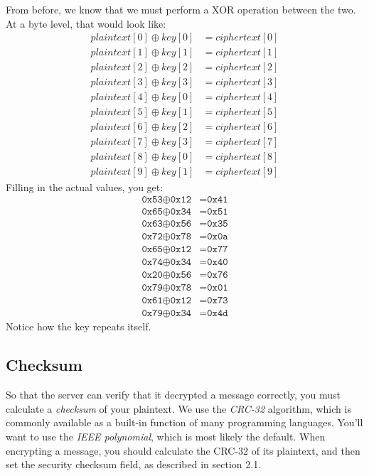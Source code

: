 \documentclass{report}
\newcommand{\code}[1]{\texttt{#1}}
\newcommand*\xor{\oplus}
\begin{document}
From before, we know that we must perform a XOR operation between the two. At a byte level, that would look like:
\begin{equation*}
\begin{split}
	plaintext[0] \xor key[0] &= ciphertext[0] \\
	plaintext[1] \xor key[1] &= ciphertext[1] \\
	plaintext[2] \xor key[2] &= ciphertext[2] \\
	plaintext[3] \xor key[3] &= ciphertext[3] \\
	plaintext[4] \xor key[0] &= ciphertext[4] \\
	plaintext[5] \xor key[1] &= ciphertext[5] \\
	plaintext[6] \xor key[2] &= ciphertext[6] \\
	plaintext[7] \xor key[3] &= ciphertext[7] \\
	plaintext[8] \xor key[0] &= ciphertext[8] \\
	plaintext[9] \xor key[1] &= ciphertext[9]
\end{split}
\end{equation*}
Filling in the actual values, you get:
\begin{equation*}
\begin{split}
	\code{0x53} \xor \code{0x12} &= \code{0x41} \\
	\code{0x65} \xor \code{0x34} &= \code{0x51} \\
	\code{0x63} \xor \code{0x56} &= \code{0x35} \\
	\code{0x72} \xor \code{0x78} &= \code{0x0a} \\
	\code{0x65} \xor \code{0x12} &= \code{0x77} \\
	\code{0x74} \xor \code{0x34} &= \code{0x40} \\
	\code{0x20} \xor \code{0x56} &= \code{0x76} \\
	\code{0x79} \xor \code{0x78} &= \code{0x01} \\
	\code{0x61} \xor \code{0x12} &= \code{0x73} \\
	\code{0x79} \xor \code{0x34} &= \code{0x4d}
\end{split}
\end{equation*}
Notice how the key repeats itself.

\subsection{Checksum}
So that the server can verify that it decrypted a message correctly, you must calculate a \emph{checksum} of your plaintext.
We use the \emph{CRC-32} algorithm, which is commonly available as a built-in function of many programming languages.
You'll want to use the \emph{IEEE polynomial}, which is most likely the default.
When encrypting a message, you should calculate the CRC-32 of its plaintext, and then set the security checksum field, as described in section 2.1.
\end{document}
